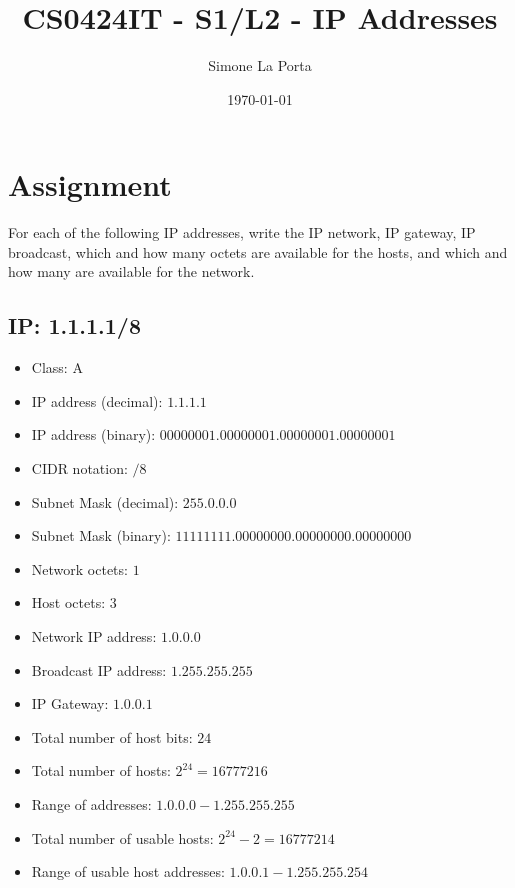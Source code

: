 \documentclass{article}
\title{CS0424IT - S1/L2 - IP Addresses} %
\author{Simone La Porta} %
\date{\today}
\begin{document}
\maketitle

\section*{Assignment}
For each of the following IP addresses, write the IP network, IP gateway,
IP broadcast, which and how many octets are available for the hosts, 
and which and how many are available for the network.

\subsection*{IP: 1.1.1.1/8}
  \begin{itemize}
    \item Class: A
    \item IP address (decimal): $1.1.1.1$
    \item IP address (binary): $00000001.00000001.00000001.00000001$
    \item CIDR notation: $/8$
    \item Subnet Mask (decimal): $255.0.0.0$ 
    \item Subnet Mask (binary): $11111111.00000000.00000000.00000000$
    \item Network octets: $1$
    \item Host octets: $3$
    \item Network IP address: $1.0.0.0$
    \item Broadcast IP address: $1.255.255.255$
    \item IP Gateway: $1.0.0.1$
    \item Total number of host bits: $24$
    \item Total number of hosts: $2^{24} = 16777216$
    \item Range of addresses: $1.0.0.0 - 1.255.255.255$
    \item Total number of usable hosts: $2^{24} - 2 = 16777214$
    \item Range of usable host addresses: $1.0.0.1 - 1.255.255.254$
  \end{itemize}
\end{document}
